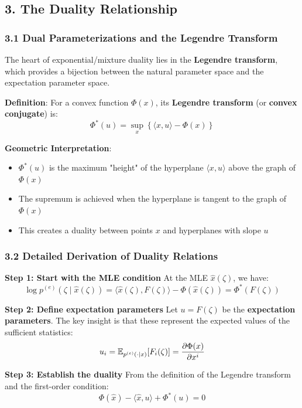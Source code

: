 \documentclass{amsart}
\let\originalmathbb\mathbb
\renewcommand{\mathbb}[1]{%
    \ifstrequal{#1}{1}{\mathbbm{#1}}{\originalmathbb{#1}}%
}
\theoremstyle{plain}
\theoremstyle{definition}
\theoremstyle{remark}
\begin{document}
\subsection{3. The Duality Relationship}

\subsubsection{3.1 Dual Parameterizations and the Legendre Transform}

The heart of exponential/mixture duality lies in the \textbf{Legendre transform}, which provides a bijection between the natural parameter space and the expectation parameter space.

\textbf{Definition}: For a convex function $\Phi(x)$, its \textbf{Legendre transform} (or \textbf{convex conjugate}) is:
\[
\Phi^{*}(u) = \sup_{x} \left\{ \langle x, u \rangle - \Phi(x) \right\}
\]

\textbf{Geometric Interpretation}:

\begin{itemize}
	\item $\Phi^{*}(u)$ is the maximum "height" of the hyperplane $\langle x, u \rangle$ above the graph of $\Phi(x)$
	\item The supremum is achieved when the hyperplane is tangent to the graph of $\Phi(x)$
	\item This creates a duality between points $x$ and hyperplanes with slope $u$
\end{itemize}

\subsubsection{3.2 Detailed Derivation of Duality Relations}

\textbf{Step 1: Start with the MLE condition}
At the MLE $\widehat{x}(\zeta)$, we have:
\[
\log p^{(e)}(\zeta \mid \widehat{x}(\zeta)) = \langle \widehat{x}(\zeta), F(\zeta) \rangle - \Phi(\widehat{x}(\zeta)) = \Phi^{*}(F(\zeta))
\]

\textbf{Step 2: Define expectation parameters}
Let $u = F(\zeta)$ be the \textbf{expectation parameters}. The key insight is that these represent the expected values of the sufficient statistics:
\[
u_i = \mathbb{E}_{p^{(e)}(\cdot \mid x)}[F_i(\zeta)] = \frac{\partial \Phi(x)}{\partial x^i}
\]

\textbf{Step 3: Establish the duality}
From the definition of the Legendre transform and the first-order condition:
\[
\Phi(\widehat{x}) - \langle \widehat{x}, u \rangle + \Phi^{*}(u) = 0
\]
\end{document}

